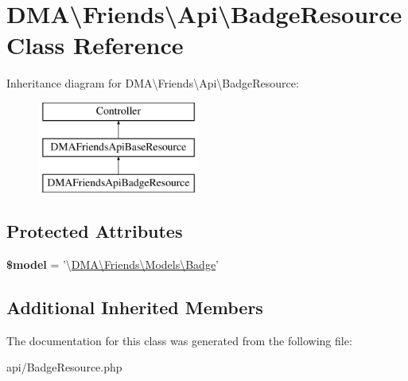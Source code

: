 \hypertarget{classDMA_1_1Friends_1_1Api_1_1BadgeResource}{\section{D\-M\-A\textbackslash{}Friends\textbackslash{}Api\textbackslash{}Badge\-Resource Class Reference}
\label{classDMA_1_1Friends_1_1Api_1_1BadgeResource}
}
Inheritance diagram for D\-M\-A\textbackslash{}Friends\textbackslash{}Api\textbackslash{}Badge\-Resource\-:\begin{figure}[H]
\begin{center}
\leavevmode
\includegraphics[height=3.000000cm]{d4/d95/classDMA_1_1Friends_1_1Api_1_1BadgeResource}
\end{center}
\end{figure}
\subsection*{Protected Attributes}
\begin{DoxyCompactItemize}
\item 
\hypertarget{classDMA_1_1Friends_1_1Api_1_1BadgeResource_ac4a608f9e0378780c36e0751eb346699}{{\bfseries \$model} = '\textbackslash{}\hyperlink{classDMA_1_1Friends_1_1Models_1_1Badge}{D\-M\-A\textbackslash{}\-Friends\textbackslash{}\-Models\textbackslash{}\-Badge}'}\label{classDMA_1_1Friends_1_1Api_1_1BadgeResource_ac4a608f9e0378780c36e0751eb346699}

\end{DoxyCompactItemize}
\subsection*{Additional Inherited Members}


The documentation for this class was generated from the following file\-:\begin{DoxyCompactItemize}
\item 
api/Badge\-Resource.\-php\end{DoxyCompactItemize}
